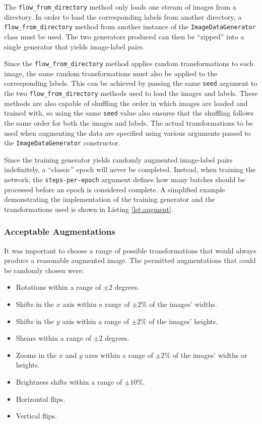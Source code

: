 The \texttt{flow\_from\_directory} method only loads one stream of images from a directory. In order to load the corresponding labels from another directory, a \texttt{flow\_from\_directory} method from another instance of the \texttt{ImageDataGenerator} class must be used. The two generators produced can then be ``zipped'' into a single generator that yields image-label pairs.

Since the \texttt{flow\_from\_directory} method applies random transformations to each image, the same random transformations must also be applied to the corresponding labels. This can be achieved by passing the same \texttt{seed} argument to the two \texttt{flow\_from\_directory} methods used to load the images and labels. These methods are also capable of shuffling the order in which images are loaded and trained with, so using the same \texttt{seed} value also ensures that the shuffling follows the same order for both the images and labels. The actual transformations to be used when augmenting the data are specified using various arguments passed to the \texttt{ImageDataGenerator} constructor.

Since the training generator yields randomly augmented image-label pairs indefinitely, a ``classic'' epoch will never be completed. Instead, when training the network, the \texttt{steps-per-epoch} argument defines how many batches should be processed before an epoch is considered complete. A simplified example demonstrating the implementation of the training generator and the transformations used is shown in Listing \ref{lst:augment}.

\subsubsection{Acceptable Augmentations}

It was important to choose a range of possible transformations that would always produce a reasonable augmented image. The permitted augmentations that could be randomly chosen were:

\begin{itemize}
    \item Rotations within a range of $\pm 2$ degrees.
    \item Shifts in the $x$ axis within a range of $\pm 2\%$ of the images' widths.
    \item Shifts in the $y$ axis within a range of $\pm 2\%$ of the images' heights.
    \item Shears within a range of $\pm 2$ degrees.
    \item Zooms in the $x$ and $y$ axes within a range of $\pm 2\%$ of the images' widths or heights.
    \item Brightness shifts within a range of $\pm 10\%$.
    \item Horizontal flips.
    \item Vertical flips.
\end{itemize}


